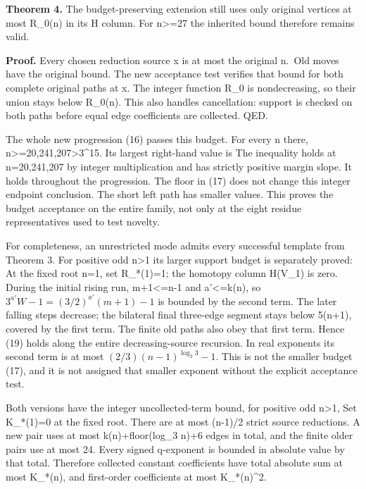 \textbf{Theorem 4.} The budget-preserving extension still uses only
original vertices at most R\_0(n) in its H column. For n\textgreater=27
the inherited bound  therefore
remains valid.

\textbf{Proof.} Every chosen reduction source x is at most the original
n.~Old moves have the original bound. The new acceptance test verifies
that bound for both complete original paths at x. The integer function
R\_0 is nondecreasing, so their union stays below R\_0(n). This also
handles cancellation: support is checked on both paths before equal edge
coefficients are collected. QED.

The whole new progression (16) passes this budget. For every n there,
n\textgreater=20,241,207\textgreater3\^{}15. Its largest right-hand
value is  The inequality
 holds at n=20,241,207 by
integer multiplication and has strictly positive margin slope. It holds
throughout the progression. The floor in (17) does not change this
integer endpoint conclusion. The short left path has smaller values.
This proves the budget acceptance on the entire family, not only at the
eight residue representatives used to test novelty.

For completeness, an unrestricted mode admits every successful template
from Theorem 3. For positive odd n\textgreater1 its larger support
budget is separately proved:
At the fixed root n=1, set R\_*(1)=1; the homotopy column H(V\_1) is
zero. During the initial rising run, m+1\textless=n-1 and
a'\textless=k(n), so \(3^{a'}W-1=(3/2)^{a'}(m+1)-1\) is bounded by the
second term. The later falling steps decrease; the bilateral final
three-edge segment stays below 5(n+1), covered by the first term. The
finite old paths also obey that first term. Hence (19) holds along the
entire decreasing-source recursion. In real exponents its second term is
at most \((2/3)(n-1)^{\log_2 3}-1\). This is not the smaller budget
(17), and it is not assigned that smaller exponent without the explicit
acceptance test.

Both versions have the integer uncollected-term bound, for positive odd
n\textgreater1,
Set K\_*(1)=0 at the fixed root. There are at most (n-1)/2 strict source
reductions. A new pair uses at most k(n)+floor(log\_3 n)+6 edges in
total, and the finite older pairs use at most 24. Every signed
q-exponent is bounded in absolute value by that total. Therefore
collected constant coefficients have total absolute sum at most K\_*(n),
and first-order coefficients at most K\_*(n)\^{}2.

